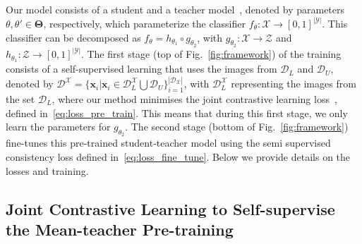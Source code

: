 \documentclass[runningheads]{llncs}
\begin{document}
Our model consists of a  student and a teacher model~\cite{tarvainen2017mean}, denoted by parameters $\theta,\theta' \in \mathbf{\Theta}$, respectively, which parameterize the classifier $f_{\theta}:\mathcal{X} \rightarrow [0,1]^{|\mathcal{Y}|}$.
This classifier can be decomposed as $f_{\theta} = h_{\theta_1}\circ g_{\theta_2}$, with $g_{\theta_2}:\mathcal{X} \rightarrow \mathcal{Z}$ and $h_{\theta_1}:\mathcal{Z} \rightarrow [0,1]^{|\mathcal{Y}|}$.
The first stage (top of Fig.~\ref{fig:framework}) of the training consists of a self-supervised learning that uses the images from $\mathcal{D}_L$ and $\mathcal{D}_U$, denoted by $\mathcal{D}^{\mathcal{X}} = \{ \mathbf{x}_i | \mathbf{x}_i \in \mathcal{D}^{\mathcal{X}}_L \bigcup \mathcal{D}_U\}_{i=1}^{|\mathcal{D}_{\mathcal{X}}|}$, with $\mathcal{D}^{\mathcal{X}}_L$ representing the images from the set $\mathcal{D}_L$, where our method minimises the joint contrastive learning loss~\cite{cai2020joint}, defined in~\eqref{eq:loss_pre_train}.  This means that during this first stage, we only learn the parameters for $g_{\theta_2}$.
The second stage (bottom of Fig.~\ref{fig:framework}) fine-tunes this pre-trained student-teacher model using the semi supervised consistency loss defined in~\eqref{eq:loss_fine_tune}. Below we provide details on the losses and training.





\vspace{-.1in}
\subsection{Joint Contrastive Learning to Self-supervise the Mean-teacher Pre-training}
\end{document}
